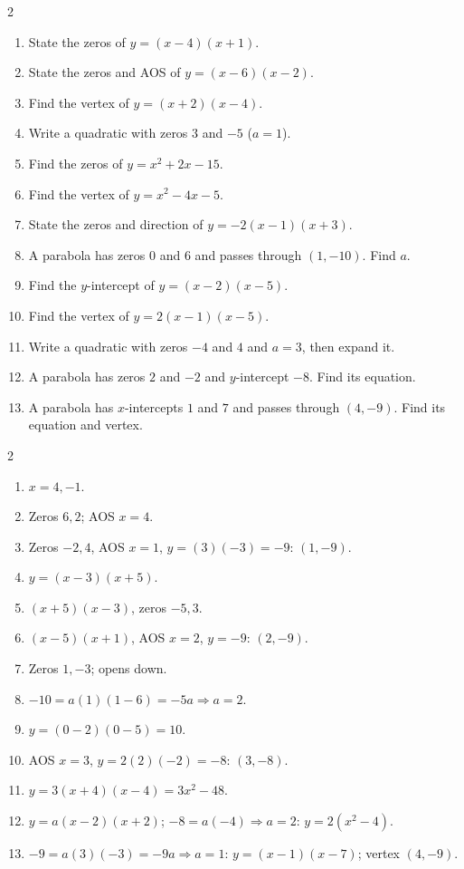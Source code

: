 \documentclass[11pt]{article}
\begin{document}
\begin{recapbox}
\begin{multicols}{2}
\small
\begin{enumerate}[leftmargin=*,itemsep=3pt]
  \item State the zeros of $y=(x-4)(x+1)$.
  \item State the zeros and AOS of $y=(x-6)(x-2)$.
  \item Find the vertex of $y=(x+2)(x-4)$.
  \item Write a quadratic with zeros $3$ and $-5$ ($a=1$).
  \item Find the zeros of $y=x^2+2x-15$.
  \item Find the vertex of $y=x^2-4x-5$.
  \item State the zeros and direction of $y=-2(x-1)(x+3)$.
  \item A parabola has zeros $0$ and $6$ and passes through $(1,-10)$. Find $a$.
  \item Find the $y$-intercept of $y=(x-2)(x-5)$.
  \item Find the vertex of $y=2(x-1)(x-5)$.
  \item Write a quadratic with zeros $-4$ and $4$ and $a=3$, then expand it.
  \item A parabola has zeros $2$ and $-2$ and $y$-intercept $-8$. Find its equation.
  \item A parabola has $x$-intercepts $1$ and $7$ and passes through $(4,-9)$. Find its equation and vertex.
\end{enumerate}
\end{multicols}
\end{recapbox}

\begin{keybox}
\begin{multicols}{2}
\small
\begin{enumerate}[leftmargin=*,itemsep=3pt]
  \item $x=4,-1$.
  \item Zeros $6,2$; AOS $x=4$.
  \item Zeros $-2,4$, AOS $x=1$, $y=(3)(-3)=-9$: $(1,-9)$.
  \item $y=(x-3)(x+5)$.
  \item $(x+5)(x-3)$, zeros $-5,3$.
  \item $(x-5)(x+1)$, AOS $x=2$, $y=-9$: $(2,-9)$.
  \item Zeros $1,-3$; opens down.
  \item $-10=a(1)(1-6)=-5a\Rightarrow a=2$.
  \item $y=(0-2)(0-5)=10$.
  \item AOS $x=3$, $y=2(2)(-2)=-8$: $(3,-8)$.
  \item $y=3(x+4)(x-4)=3x^2-48$.
  \item $y=a(x-2)(x+2)$; $-8=a(-4)\Rightarrow a=2$: $y=2(x^2-4)$.
  \item $-9=a(3)(-3)=-9a\Rightarrow a=1$: $y=(x-1)(x-7)$; vertex $(4,-9)$.
\end{enumerate}
\end{multicols}
\end{keybox}
\end{document}
